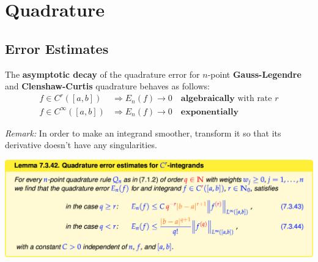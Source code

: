 \documentclass[12pt, a4paper]{article}
\begin{document}
\section{Quadrature}

\subsection{Error Estimates}

The \textbf{asymptotic decay} of the quadrature error for $n$-point \textbf{Gauss-Legendre} and \textbf{Clenshaw-Curtis} quadrature behaves as follows:
\begin{equation*}
\begin{split}
	f \in C^r([a,b]) & \Rightarrow E_n(f) \rightarrow 0 \quad\textbf{algebraically}\text{ with rate $r$} \\
	f \in C^\infty([a,b]) & \Rightarrow E_n(f) \rightarrow 0 \quad\textbf{exponentially}
\end{split}
\end{equation*}

\emph{Remark:} In order to make an integrand smoother, transform it so that its derivative doesn't have any singularities.

\begin{center}
	\includegraphics[width=380pt]{quadrature_error}
\end{center}
\end{document}
